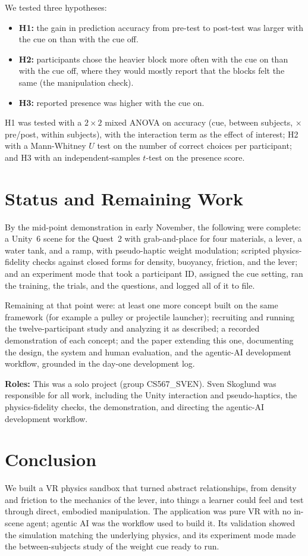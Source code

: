 \documentclass[sigconf,nonacm]{acmart}
\begin{document}
We tested three hypotheses:
\begin{itemize}
  \item \textbf{H1:} the gain in prediction accuracy from pre-test to post-test was larger
        with the cue on than with the cue off.
  \item \textbf{H2:} participants chose the heavier block more often with the cue on than with
        the cue off, where they would mostly report that the blocks felt the same (the
        manipulation check).
  \item \textbf{H3:} reported presence was higher with the cue on.
\end{itemize}
H1 was tested with a $2\times2$ mixed ANOVA on accuracy (cue, between subjects, $\times$
pre/post, within subjects), with the interaction term as the effect of interest; H2 with a
Mann-Whitney $U$ test on the number of correct choices per participant; and H3 with an
independent-samples $t$-test on the presence score.

\section{Status and Remaining Work}
\label{sec:deliverables}
By the mid-point demonstration in early November, the following were complete: a Unity~6
scene for the Quest~2 with grab-and-place for four materials, a lever, a water tank, and a
ramp, with pseudo-haptic weight modulation; scripted physics-fidelity checks against closed
forms for density, buoyancy, friction, and the lever; and an experiment mode that took a
participant ID, assigned the cue setting, ran the training, the trials, and the
questions, and logged all of it to file.

Remaining at that point were: at least one more concept built on the same framework (for
example a pulley or projectile launcher); recruiting and running the twelve-participant study
and analyzing it as described; a recorded demonstration of each concept; and the paper
extending this one, documenting the design, the system and human evaluation, and the
agentic-AI development workflow, grounded in the day-one development log.

\textbf{Roles:} This was a solo project (group CS567\_SVEN). Sven Skoglund was responsible for
all work, including the Unity interaction and pseudo-haptics, the physics-fidelity checks, the
demonstration, and directing the agentic-AI development workflow.

\section{Conclusion}
We built a VR physics sandbox that turned abstract relationships, from density and friction to
the mechanics of the lever, into things a learner could feel and test through direct, embodied
manipulation. The application was pure VR with no in-scene agent; agentic AI was the workflow
used to build it. Its validation showed the simulation matching the underlying physics, and its
experiment mode made the between-subjects study of the weight cue ready to run.
\end{document}
